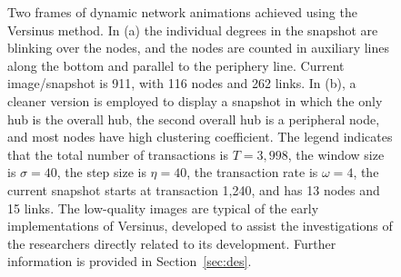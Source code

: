 \documentclass[runningheads]{llncs}
\begin{document}
\begin{figure}[!h]\centering
    \quad
    \caption{Two frames of dynamic network animations achieved using the Versinus method.
    In (a) the individual degrees in the snapshot are blinking over the nodes, and the nodes are counted in auxiliary lines along the bottom and parallel to the periphery line. Current image/snapshot is 911, with 116 nodes and 262 links.
   In (b), a cleaner version is employed to display a snapshot in which the only hub is the overall hub, the second overall hub is a peripheral node, and most nodes have high clustering coefficient. The legend indicates that the total number of transactions is $T=3,998$, the window size is $\sigma=40$, the step size is $\eta=40$, the transaction rate is $\omega=4$, the current snapshot starts at transaction 1,240, and has 13 nodes and 15 links.
   The low-quality images are typical of the early implementations of Versinus, developed to assist the investigations of the researchers directly related to its development.
   Further information is provided in Section~\ref{sec:des}.
   }%
    \label{fig:final}%
\end{figure}
\end{document}
